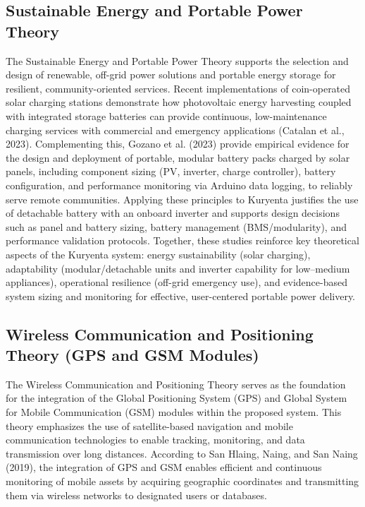 {\subsection{Sustainable Energy and Portable Power Theory}

The Sustainable Energy and Portable Power Theory supports the selection and design of renewable, off-grid power solutions and portable energy storage for resilient, community-oriented services. Recent implementations of coin-operated solar charging stations demonstrate how photovoltaic energy harvesting coupled with integrated storage batteries can provide continuous, low-maintenance charging services with commercial and emergency applications (Catalan et al., 2023). Complementing this, Gozano et al. (2023) provide empirical evidence for the design and deployment of portable, modular battery packs charged by solar panels, including component sizing (PV, inverter, charge controller), battery configuration, and performance monitoring via Arduino data logging, to reliably serve remote communities. Applying these principles to Kuryenta justifies the use of detachable battery with an onboard inverter and supports design decisions such as panel and battery sizing, battery management (BMS/modularity), and performance validation protocols. Together, these studies reinforce key theoretical aspects of the Kuryenta system: energy sustainability (solar charging), adaptability (modular/detachable units and inverter capability for low–medium appliances), operational resilience (off-grid emergency use), and evidence-based system sizing and monitoring for effective, user-centered portable power delivery.


\subsection{Wireless Communication and Positioning Theory (GPS and GSM Modules)}

The Wireless Communication and Positioning Theory serves as the foundation for the integration of the Global Positioning System (GPS) and Global System for Mobile Communication (GSM) modules within the proposed system. This theory emphasizes the use of satellite-based navigation and mobile communication technologies to enable tracking, monitoring, and data transmission over long distances. According to San Hlaing, Naing, and San Naing (2019), the integration of GPS and GSM enables efficient and continuous monitoring of mobile assets by acquiring geographic coordinates and transmitting them via wireless networks to designated users or databases.

}
